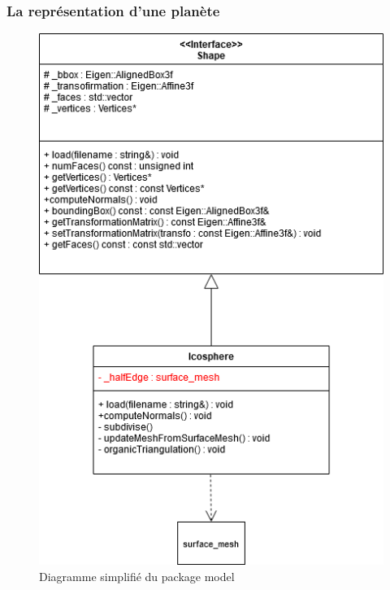 \documentclass[a4paper]{article}
\begin{document}
\subsubsection{La représentation d'une planète}

 \begin{figure}[!ht]
        \begin{center} \includegraphics[width=0.6\linewidth]{img/archi/model_shape.png}\end{center}
        \caption{\label{archi_shape}Diagramme simplifié du package model}
    \end{figure}
    
\end{document}
